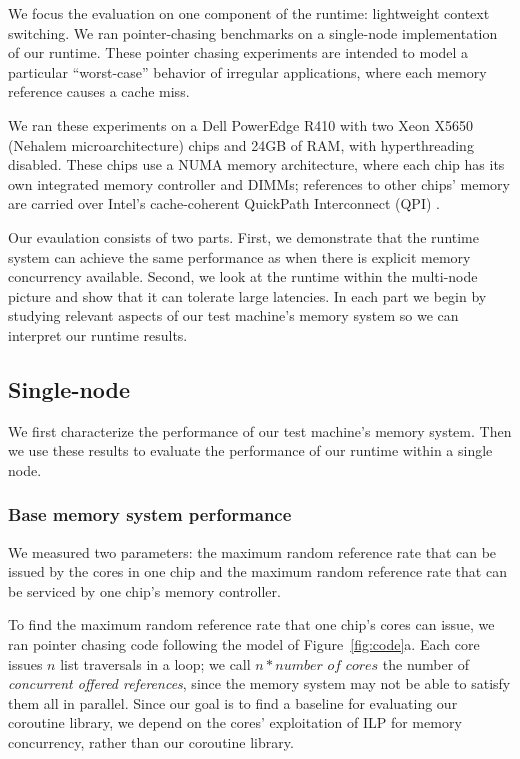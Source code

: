 \documentclass[10pt,nocopyrightspace,preprint]{sigplanconf}
\begin{document}
We focus the evaluation on one component of the runtime: lightweight context switching. We ran pointer-chasing benchmarks on a single-node implementation of our runtime. These pointer chasing experiments are intended to model a particular ``worst-case'' behavior of irregular applications, where each memory reference causes a cache miss.

We ran these experiments on a Dell PowerEdge R410 with two Xeon X5650 (Nehalem microarchitecture)
chips and 24GB of RAM, with hyperthreading disabled. These
chips use a NUMA memory architecture, where each chip has
its own integrated memory controller and DIMMs; references to other
chips' memory are carried over Intel's cache-coherent QuickPath
Interconnect (QPI) \cite{quickpath:website}.

Our evaulation consists of two parts. First, we demonstrate that the runtime system can achieve the same performance as when there is explicit memory concurrency available. Second, we look at the runtime within the multi-node picture and show that it can tolerate large latencies. In each part we begin by studying relevant aspects of our test machine's memory system so we can interpret our runtime results.


\subsection{Single-node}

We first characterize the performance of our test machine's memory
system. Then we use these results to evaluate the performance of our runtime within a single node.

\subsubsection{Base memory system performance}
\label{subsubsec:evalsinglebase}

We measured two parameters: the maximum random reference
rate that can be issued by the cores in one chip and the maximum random
reference rate that can be serviced by one chip's memory controller. 

To find the maximum random reference rate that one chip's cores
can issue, we ran pointer chasing code following the model of
Figure~\ref{fig:code}a. Each core issues $n$ list traversals
in a loop; we call $n * \textit{number of cores}$ the number of
{\em concurrent offered references}, since the memory system may not
be able to satisfy them all in parallel. Since our goal is to find a
baseline for evaluating our coroutine library, we depend on the
cores' exploitation of ILP for memory concurrency, rather than our coroutine
library.
\end{document}
